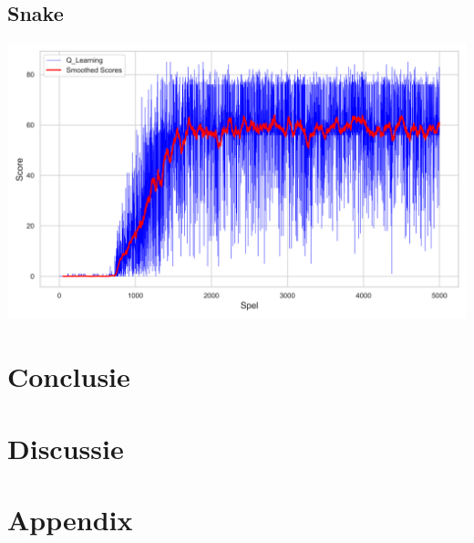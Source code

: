 \documentclass[a4paper,12pt]{report}
\begin{document}
\section{Snake}

\includegraphics[width=1\textwidth]{assets/Q-LearningGrafiek.png}

\chapter{Conclusie}

\chapter{Discussie}

\chapter*{Appendix}

\printbibliography
{}
\end{document}
